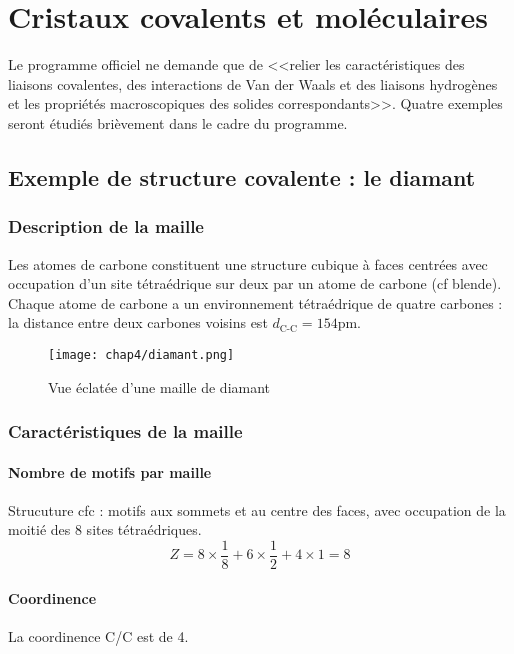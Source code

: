 \chapter{Cristaux covalents et moléculaires}
Le programme officiel ne demande que de <<relier les caractéristiques des liaisons
covalentes, des interactions de Van der Waals et des liaisons hydrogènes et les
propriétés macroscopiques des solides correspondants>>. Quatre exemples seront étudiés
brièvement dans le cadre du programme.

\section{Exemple de structure covalente : le diamant }
\subsection{Description de la maille}
Les atomes de carbone constituent une structure cubique à faces centrées avec
occupation d’un site tétraédrique sur deux par un atome de carbone (cf blende). Chaque
atome de carbone a un environnement tétraédrique de quatre carbones : la distance
entre deux carbones voisins est $d_\text{C-C} = 154$pm.

\begin{figure}
    \centering
    \texttt{[image: chap4/diamant.png]}
    \caption{Vue éclatée d'une maille de diamant}\label{fig:4_diamant_eclatee}
\end{figure}

\subsection{Caractéristiques de la maille}
\subsubsection{Nombre de motifs par maille}
Strucuture cfc : motifs aux sommets et au centre des faces, avec occupation de la
moitié des 8 sites tétraédriques.
\begin{equation}
    Z = 8 \times \frac{1}{8} + 6 \times \frac{1}{2} + 4 \times 1 = 8
\end{equation}

\subsubsection{Coordinence}
La coordinence C/C est de 4.

